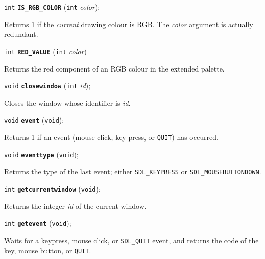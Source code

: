 \documentclass[a4paper,11pt]{article}
\newcommand{\V}{\texttt{void}}      %
\newcommand{\I}{\texttt{int}}       %
\newcommand{\func}[1]{\textbf{\texttt{#1}}}  %
\newcommand{\A}[1]{\emph{#1}}       %
\newcommand{\T}[1]{\texttt{#1}}     %
\newenvironment{bgi}
{ %
  \begin{snugshade}
}
{ %
  \end{snugshade}
}
\begin{document}

\begin{bgi}
\I{} \func{IS\_RGB\_COLOR} (\I{} \A{color});
\end{bgi}

Returns 1 if the \emph{current} drawing colour is RGB. The \A{color}
argument is actually redundant.


\begin{bgi}
\I{} \func{RED\_VALUE} (\I{} \A{color})
\end{bgi}

Returns the red component of an RGB colour in the extended palette.


\begin{bgi}
\V{} \func{closewindow} (\I{} \A{id});
\end{bgi}

Closes the window whose identifier is \A{id}.


\begin{bgi}
\V{} \func{event} (\V{});
\end{bgi}

Returns 1 if an event (mouse click, key press, or \T{QUIT}) has occurred.


\begin{bgi}
\V{} \func{eventtype} (\V{});
\end{bgi}

Returns the type of the last event; either \T{SDL\_KEYPRESS} or
\T{SDL\_MOUSEBUTTONDOWN}.


\begin{bgi}
\I{} \func{getcurrentwindow} (\V{});
\end{bgi}

Returns the integer \A{id} of the current window.


\begin{bgi}
\I{} \func{getevent} (\V{});
\end{bgi}

Waits for a keypress, mouse click, or \T{SDL\_QUIT} event, and returns
the code of the key, mouse button, or \T{QUIT}.


\end{document}
